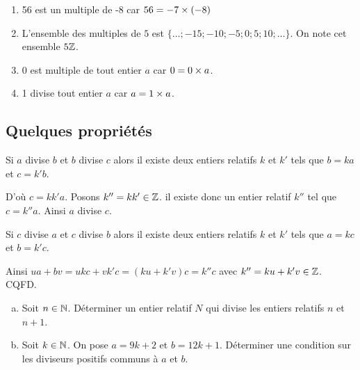 \documentclass[10pt,a4paper]{article}
\begin{document}
\exes
\begin{enumerate}[$\bullet$]
\item 56 est un multiple de -8 car $56=-7\times(-8)$
\item L'ensemble des multiples de $5$ est $\{\dots;-15;-10;-5;0;5;10;\dots\}$. On note cet ensemble $5\mathbb{Z}$.
\item 0 est multiple de tout entier $a$ car $0 = 0 \times a$.
\item 1 divise tout entier $a$ car $a = 1 \times a$.
\end{enumerate}



\subsection*{Quelques propriétés}

\renewcommand{\arraystretch}{1} 


\dem Si $a$ divise $b$ et $b$ divise $c$ alors il existe deux entiers relatifs $k$ et $k'$ tels que $b=ka$ et $c=k'b$.

D'où $c=kk'a$. Posons $k''=kk' \in \mathbb{Z}$. il existe donc un entier relatif $k''$ tel que $c=k''a$. Ainsi $a$ divise $c$.




\dem Si $c$ divise $a$ et $c$ divise $b$ alors il existe deux entiers relatifs $k$ et $k'$ tels que $a=kc$ et $b=k'c$.

Ainsi $ua+bv=ukc+vk'c=(ku+k'v)c=k''c$ avec $k''=ku+k'v \in \mathbb{Z}$. CQFD.

\exes
\begin{enumerate}[a.]
\item Soit $n \in \mathbb{N}$. Déterminer un entier relatif $N$ qui divise les entiers relatifs $n$ et $n+1$.
\item Soit $k \in \mathbb{N}$. On pose $a=9k+2$ et $b=12k+1$. Déterminer une condition sur les diviseurs positifs communs à $a$ et $b$.
\end{enumerate}
\end{document}
